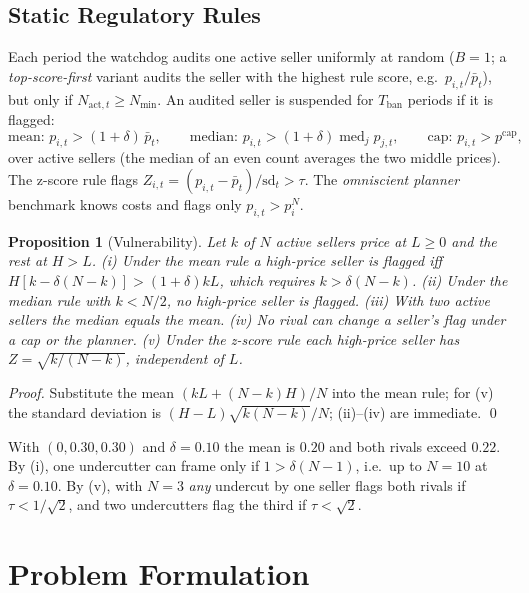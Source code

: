 \documentclass{article}
\newtheorem{proposition}{Proposition}
\newcommand{\Nact}{N_{\mathrm{act},t}}
\newcommand{\Nmin}{N_{\min}}
\newcommand{\Tban}{T_{\mathrm{ban}}}
\begin{document}
\subsection{Static Regulatory Rules}
Each period the watchdog audits one active seller uniformly at random ($B=1$; a \emph{top-score-first} variant audits the seller with the highest rule score, e.g.\ $p_{i,t}/\bar p_t$), but only if $\Nact\ge\Nmin$. An audited seller is suspended for $\Tban$ periods if it is flagged:
\begin{equation}
\text{mean: } p_{i,t}>(1+\delta)\,\bar p_t,\qquad \text{median: } p_{i,t}>(1+\delta)\operatorname{med}_j p_{j,t},\qquad \text{cap: } p_{i,t}>p^{\mathrm{cap}},
\end{equation}
over active sellers (the median of an even count averages the two middle prices). The z-score rule flags $Z_{i,t}=(p_{i,t}-\bar p_t)/\mathrm{sd}_t>\tau$. The \emph{omniscient planner} benchmark knows costs and flags only $p_{i,t}>p^N_i$.

\begin{proposition}[Vulnerability]\label{prop:vuln}
Let $k$ of $N$ active sellers price at $L\ge0$ and the rest at $H>L$. (i) Under the mean rule a high-price seller is flagged iff $H[k-\delta(N-k)]>(1+\delta)kL$, which requires $k>\delta(N-k)$. (ii) Under the median rule with $k<N/2$, no high-price seller is flagged. (iii) With two active sellers the median equals the mean. (iv) No rival can change a seller's flag under a cap or the planner. (v) Under the z-score rule each high-price seller has $Z=\sqrt{k/(N-k)}$, independent of $L$.
\end{proposition}
\emph{Proof.} Substitute the mean $(kL+(N-k)H)/N$ into the mean rule; for (v) the standard deviation is $(H-L)\sqrt{k(N-k)}/N$; (ii)--(iv) are immediate. \qed

With $(0,0.30,0.30)$ and $\delta=0.10$ the mean is $0.20$ and both rivals exceed $0.22$. By (i), one undercutter can frame only if $1>\delta(N-1)$, i.e.\ up to $N=10$ at $\delta=0.10$. By (v), with $N=3$ \emph{any} undercut by one seller flags both rivals if $\tau<1/\sqrt2$, and two undercutters flag the third if $\tau<\sqrt2$.

\section{Problem Formulation}
\end{document}
